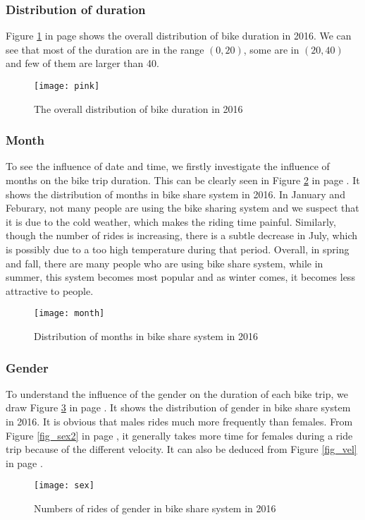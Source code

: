 	\subsubsection{Distribution of duration}
	Figure \ref{fig_pink} in page \pageref{fig_pink} shows the overall distribution of bike duration in 2016. We can see that most of the duration are in the range $(0,20)$, some are in $(20,40)$ and few of them are larger than 40.
		  \begin{figure}[h]
		  \centering
		  \texttt{[image: pink]}
		  \caption{The overall distribution of bike duration in 2016}
		  \label{fig_pink}
		  \end{figure}

	\subsubsection{Month}
	To see the influence of date and time, we firstly investigate the influence of months on the bike trip duration. This can be clearly seen in Figure \ref{fig_month} in page \pageref{fig_month}. It shows the distribution of months in bike share system in 2016. In January and Feburary, not many people are using the bike sharing system and we suspect that it is due to the cold weather, which makes the riding time painful. Similarly, though the number of rides is increasing, there is a subtle decrease in July, which is possibly due to a too high temperature during that period. Overall, in spring and fall, there are many people who are using bike share system, while in summer, this system becomes most popular and as winter comes, it becomes less attractive to people.
		  \begin{figure}[h]
		  \centering
		  \texttt{[image: month]}
		  \caption{Distribution of months in bike share system in 2016}
		  \label{fig_month}
		  \end{figure}

	\subsubsection{Gender}
	To understand the influence of the gender on the duration of each bike trip, we draw Figure \ref{fig_sex} in page \pageref{fig_sex}. It shows the distribution of gender in bike share system in 2016. It is obvious that males rides much more frequently than females. From Figure \ref{fig_sex2} in page \pageref{fig_sex2}, it generally takes more time for females during a ride trip because of the different velocity. It can also be deduced from Figure \ref{fig_vel} in page \pageref{fig_vel}.
		  \begin{figure}[h]
		  \centering
		  \texttt{[image: sex]}
		  \caption{Numbers of rides of gender in bike share system in 2016}
		  \label{fig_sex}
		  \end{figure}

